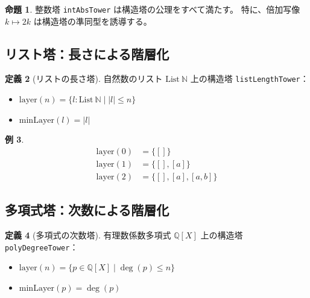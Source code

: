 \documentclass[a4paper,12pt]{ltjsarticle}
\theoremstyle{definition}
\newtheorem{definition}{定義}[section]
\newtheorem{proposition}[definition]{命題}
\newtheorem{example}[definition]{例}
\begin{document}
\begin{center}
\end{center}

\begin{proposition}
整数塔 \texttt{intAbsTower} は構造塔の公理をすべて満たす。
特に、倍加写像 $k \mapsto 2k$ は構造塔の準同型を誘導する。
\end{proposition}

\subsection{リスト塔：長さによる階層化}

\begin{definition}[リストの長さ塔]
自然数のリスト $\text{List}\ \mathbb{N}$ 上の構造塔 \texttt{listLengthTower}：
\begin{itemize}
\item $\text{layer}(n) = \{l : \text{List}\ \mathbb{N} \mid |l| \leq n\}$
\item $\text{minLayer}(l) = |l|$
\end{itemize}
\end{definition}

\begin{example}
\begin{align*}
\text{layer}(0) &= \{[]\} \\
\text{layer}(1) &= \{[], [a]\} \\
\text{layer}(2) &= \{[], [a], [a,b]\}
\end{align*}
\end{example}

\subsection{多項式塔：次数による階層化}

\begin{definition}[多項式の次数塔]
有理数係数多項式 $\mathbb{Q}[X]$ 上の構造塔 \texttt{polyDegreeTower}：
\begin{itemize}
\item $\text{layer}(n) = \{p \in \mathbb{Q}[X] \mid \deg(p) \leq n\}$
\item $\text{minLayer}(p) = \deg(p)$
\end{itemize}
\end{definition}
\end{document}
